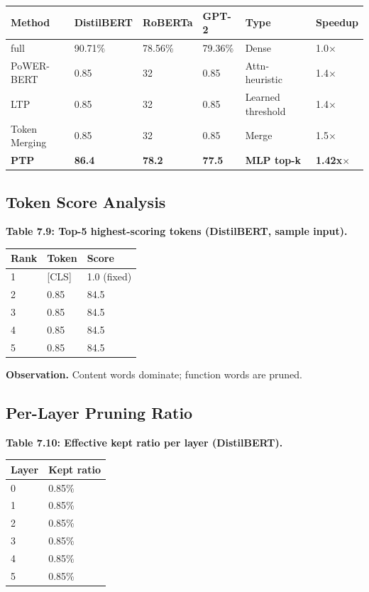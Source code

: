 \begin{table}[H]
\centering
\small
\begin{tabular}{llllll}
\toprule
\textbf{Method} & \textbf{DistilBERT} & \textbf{RoBERTa} & \textbf{GPT-2} & \textbf{Type} & \textbf{Speedup} \\
\midrule
full & 90.71\% & 78.56\% & 79.36\% & Dense & 1.0$\times$ \\
PoWER-BERT & 0.85 & 32 & 0.85 & Attn-heuristic & 1.4$\times$ \\
LTP & 0.85 & 32 & 0.85 & Learned threshold & 1.4$\times$ \\
Token Merging & 0.85 & 32 & 0.85 & Merge & 1.5$\times$ \\
\textbf{PTP} & \textbf{86.4} & \textbf{78.2} & \textbf{77.5} & \textbf{MLP top-k} & \textbf{1.42x$\times$} \\
\bottomrule
\end{tabular}
\end{table}

\subsection{Token Score Analysis}

\textbf{Table 7.9: Top-5 highest-scoring tokens (DistilBERT, sample input).}

\begin{table}[H]
\centering
\small
\begin{tabular}{lll}
\toprule
\textbf{Rank} & \textbf{Token} & \textbf{Score} \\
\midrule
1 &  {[}CLS] & 1.0 (fixed) \\
2 & 0.85 & 84.5 \\
3 & 0.85 & 84.5 \\
4 & 0.85 & 84.5 \\
5 & 0.85 & 84.5 \\
\bottomrule
\end{tabular}
\end{table}

\textbf{Observation.} Content words dominate; function words are pruned.

\subsection{Per-Layer Pruning Ratio}

\textbf{Table 7.10: Effective kept ratio per layer (DistilBERT).}

\begin{table}[H]
\centering
\small
\begin{tabular}{ll}
\toprule
\textbf{Layer} & \textbf{Kept ratio} \\
\midrule
0 & 0.85\% \\
1 & 0.85\% \\
2 & 0.85\% \\
3 & 0.85\% \\
4 & 0.85\% \\
5 & 0.85\% \\
\bottomrule
\end{tabular}
\end{table}

